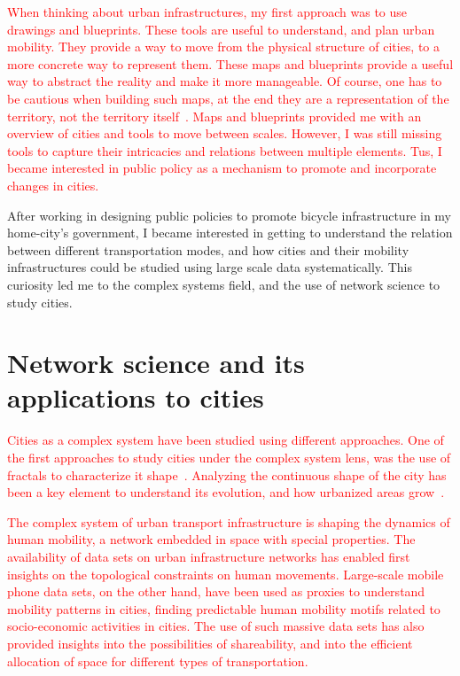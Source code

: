 \textcolor{red}{When thinking about urban infrastructures, my first approach was to use drawings and blueprints. These tools are useful to understand, and plan urban mobility. They provide a way to move from the physical structure of cities, to a more concrete way to represent them. These maps and blueprints provide a useful way to abstract the reality and make it more manageable. Of course, one has to be cautious when building such maps, at the end they are a representation of the territory, not the territory itself~\cite{borges1961hacedor}. Maps and blueprints provided me with an overview of cities and tools to move between scales. However, I was still missing tools to capture their intricacies and relations between multiple elements. Tus, I became interested in public policy as a mechanism to promote and incorporate changes in cities.}

After working in designing public policies to promote bicycle infrastructure in my home-city's government, I became interested in getting to understand the relation between different transportation modes, and how cities and their mobility infrastructures could be studied using large scale data systematically. This curiosity led me to the complex systems field, and the use of network science to study cities.

\section{Network science and its applications to cities}

\textcolor{red}{}

\textcolor{red}{Cities as a complex system have been studied using different approaches. One of the first approaches to study cities under the complex system lens, was the use of fractals to characterize it shape~\cite{batty1996preliminary}. Analyzing the continuous shape of the city has been a key element to understand its evolution, and how urbanized areas grow~\cite{makse1995growth}.}

\textcolor{red}{The complex system of urban transport infrastructure is shaping the dynamics of human mobility, a network embedded in space with special properties. The availability of data sets on urban infrastructure networks has enabled first insights on the topological constraints on human movements. Large-scale mobile phone data sets, on the other hand, have been used as proxies to understand mobility patterns in cities, finding predictable human mobility motifs related to socio-economic activities in cities. The use of such massive data sets has also provided insights into the possibilities of shareability, and into the efficient allocation of space for different types of transportation.}


